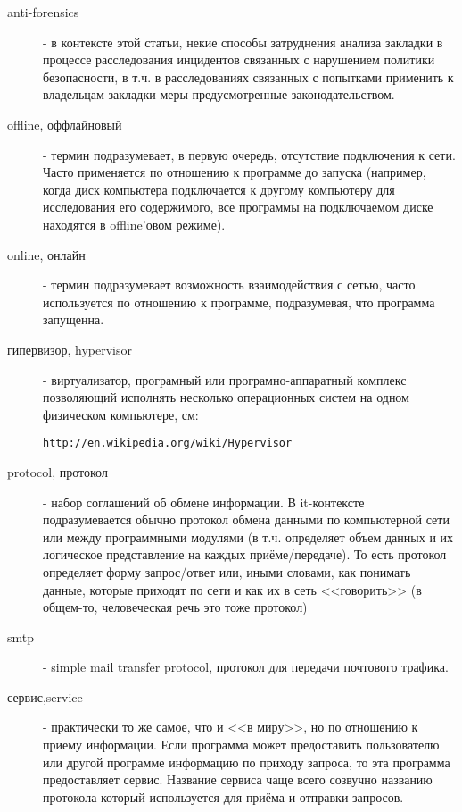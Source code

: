 \begin{description}
\item[anti-forensics]
- в контексте этой статьи, некие способы затруднения анализа закладки в процессе расследования инцидентов связанных с нарушением политики безопасности, в т.ч. в расследованиях связанных с попытками применить к владельцам закладки меры предусмотренные законодательством.

\item[offline, оффлайновый]
 - термин подразумевает, в первую очередь, отсутствие подключения к сети.
Часто применяется по отношению к программе до запуска (например, когда диск компьютера подключается
к другому компьютеру для исследования его содержимого, все программы на подключаемом диске находятся
 в offline'овом режиме).

\item[online, онлайн]
 - термин подразумевает возможность взаимодействия с сетью, часто используется
по отношению к программе, подразумевая, что программа запущенна.

\item[гипервизор, hypervisor]
- виртуализатор, програмный или програмно-аппаратный комплекс позволяющий исполнять несколько операционных
систем на одном физическом компьютере, см:
\begin{verbatim}
http://en.wikipedia.org/wiki/Hypervisor
\end{verbatim}

\item[protocol, протокол]
 - набор соглашений об обмене информации. В it-контексте
подразумевается обычно протокол обмена данными по компьютерной сети или между
программными модулями (в т.ч. определяет объем данных и их логическое
представление на каждых приёме/передаче).
То есть протокол определяет форму
запрос/ответ или, иными словами, как понимать данные, которые приходят по
сети и как их в сеть <<говорить>> (в общем-то, человеческая речь это тоже
протокол)

\item[smtp]
 - simple mail transfer protocol, протокол для передачи почтового трафика.

\item[сервис,service]
 - практически то же самое, что и <<в миру>>, но по отношению к
приему информации. Если программа может предоставить пользователю или другой
программе информацию по приходу запроса, то эта программа предоставляет сервис.
Название сервиса чаще всего созвучно названию протокола который используется
для приёма и отправки запросов.


\end{description}
